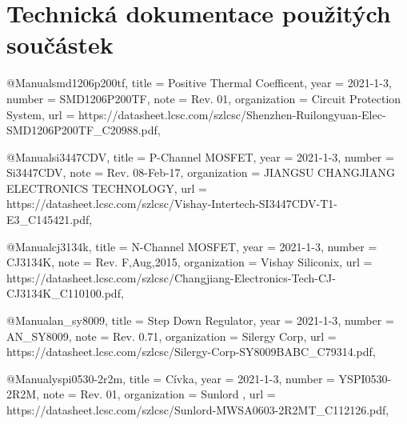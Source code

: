 \section{Technická dokumentace použitých součástek}

@Manual{smd1206p200tf,
    title        = {Positive Thermal Coefficent},
    year         = {2021-1-3},
    number       = {SMD1206P200TF},
    note         = {Rev. 01},
    organization = {Circuit Protection System},
    url          = {https://datasheet.lcsc.com/szlcsc/Shenzhen-Ruilongyuan-Elec-SMD1206P200TF_C20988.pdf},
}

@Manual{si3447CDV,
    title        = {P-Channel MOSFET},
    year         = {2021-1-3},
    number       = {Si3447CDV},
    note         = {Rev. 08-Feb-17},
    organization = {JIANGSU CHANGJIANG ELECTRONICS TECHNOLOGY},
    url          = {https://datasheet.lcsc.com\-/szlcsc/Vishay-Intertech-SI3447CDV-T1-E3_C145421.pdf},
}

@Manual{cj3134k,
    title        = {N-Channel MOSFET},
    year         = {2021-1-3},
    number       = {CJ3134K},
    note         = {Rev. F,Aug,2015},
    organization = {Vishay Siliconix},
    url          = {https://datasheet.lcsc.com/szlcsc/Changjiang-Electronics-Tech-CJ-CJ3134K\-_C110100.pdf},
}

@Manual{an_sy8009,
    title        = {Step Down Regulator},
    year         = {2021-1-3},
    num\-ber       = {AN_SY8009},
    note         = {Rev. 0.71},
    organization = {Silergy Corp},
    url          = {https://datasheet.lcsc.com/szlcsc/Silergy-Corp-SY8009BABC_C79314.pdf},
}

@Manual{yspi0530-2r2m,
    title        = {Cívka},
    year         = {2021-1-3},
    number       = {YSPI0530-2R2M},
    note         = {Rev. 01},
    organization = {Sunlord },
    url          = {https://datasheet.lcsc.com\-/szlcsc/Sunlord-MWSA0603-2R2MT_C112126.pdf},
}

